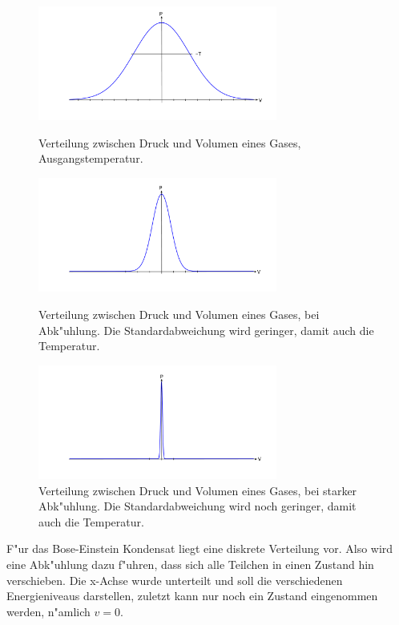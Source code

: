 \begin{refsection}
\begin{figure}
    \centering
    \includegraphics[width = 0.7\textwidth]{./bose/gauss1.pdf}
    \caption[Verteilung Ausgangstemperatur]{Verteilung zwischen Druck und Volumen eines Gases, Ausgangstemperatur.
    \label{fig:Gauss1}}
    \includegraphics[width = 0.7\textwidth]{./bose/gauss2.pdf}
    \caption[Verteilung bei Abk"uhlung]{Verteilung zwischen Druck und Volumen eines Gases, bei Abk"uhlung. Die Standardabweichung wird geringer, damit auch die Temperatur.
	\label{fig:Gauss2}}
    \includegraphics[width = 0.7\textwidth]{./bose/gauss3.pdf}
    \caption[Verteilung bei starker Abk"uhlung]{Verteilung zwischen Druck und Volumen eines Gases, bei starker Abk"uhlung. Die Standardabweichung wird noch geringer, damit auch die Temperatur.
	\label{fig:Gauss3}}
\end{figure}
F"ur das Bose-Einstein Kondensat liegt eine diskrete Verteilung vor.
Also wird eine Abk"uhlung dazu f"uhren, dass sich alle Teilchen in einen Zustand hin verschieben. Die x-Achse wurde unterteilt und soll die verschiedenen Energieniveaus darstellen, zuletzt kann nur noch ein Zustand eingenommen werden, n"amlich $v = 0$. 


\end{refsection}
